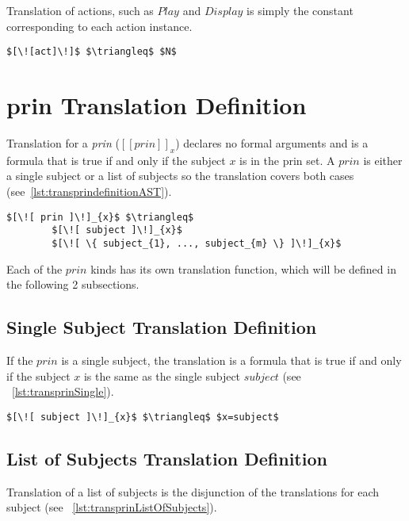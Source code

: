 Translation of actions, such as $Play$ and $Display$ is simply the constant corresponding to each action instance.

\lstset{mathescape, language=AST}  
\begin{lstlisting}[frame=single, caption={act Translation Definition},label={lst:actiontranslationAST}]
$[\![act]\!]$ $\triangleq$ $N$
\end{lstlisting}


\section{prin Translation Definition}
Translation for a \emph{prin} ($[\![ prin ]\!]_{x}$) declares no formal arguments and is a formula that is true if and only if the subject $x$ is in the prin set. A $prin$ is either a single subject or a list of subjects so the translation covers both cases (see~\ref{lst:transprindefinitionAST}).

\lstset{mathescape, language=AST}  
\begin{lstlisting}[frame=single, caption={Prin Translation Definition},label={lst:transprindefinitionAST}]
$[\![ prin ]\!]_{x}$ $\triangleq$ 
        $[\![ subject ]\!]_{x}$
        $[\![ \{ subject_{1}, ..., subject_{m} \} ]\!]_{x}$
\end{lstlisting}

Each of the $prin$ kinds has its own translation function, which will be defined in the following 2 subsections.



\subsection{Single Subject Translation Definition}
If the $prin$ is a single subject, the translation is a formula that is true if and only if the subject $x$ is the same as the single subject $subject$ (see ~\ref{lst:transprinSingle}).

\lstset{mathescape, language=AST}  
\begin{lstlisting}[frame=single, caption={Prin Translation Definition {$\colon$} Single subject},label={lst:transprinSingle}]
$[\![ subject ]\!]_{x}$ $\triangleq$ $x=subject$
\end{lstlisting}

\subsection{List of Subjects Translation Definition}
Translation of a list of subjects is the disjunction of the translations for each subject (see ~\ref{lst:transprinListOfSubjects}).

